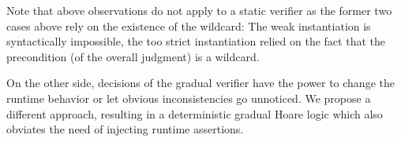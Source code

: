 Note that above observations do not apply to a static verifier as the former two cases above rely on the existence of the wildcard:
The weak instantiation is syntactically impossible, the too strict instantiation relied on the fact that the precondition (of the overall judgment) is a wildcard.

On the other side, decisions of the gradual verifier have the power to change the runtime behavior or let obvious inconsistencies go unnoticed.
We propose a different approach, resulting in a deterministic gradual Hoare logic which also obviates the need of injecting runtime assertions.



